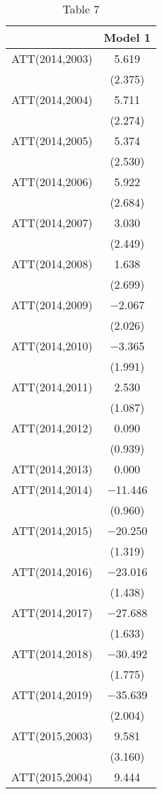 \begin{table}

\caption{\label{tab:write-results}Table 7}
\centering
\begin{tabular}[t]{lc}
\toprule
  & Model 1\\
\midrule
ATT(2014,2003) & \num{5.619}\\
 & (\num{2.375})\\
ATT(2014,2004) & \num{5.711}\\
 & (\num{2.274})\\
ATT(2014,2005) & \num{5.374}\\
 & (\num{2.530})\\
ATT(2014,2006) & \num{5.922}\\
 & (\num{2.684})\\
ATT(2014,2007) & \num{3.030}\\
 & (\num{2.449})\\
ATT(2014,2008) & \num{1.638}\\
 & (\num{2.699})\\
ATT(2014,2009) & \num{-2.067}\\
 & (\num{2.026})\\
ATT(2014,2010) & \num{-3.365}\\
 & (\num{1.991})\\
ATT(2014,2011) & \num{2.530}\\
 & (\num{1.087})\\
ATT(2014,2012) & \num{0.090}\\
 & (\num{0.939})\\
ATT(2014,2013) & \num{0.000}\\
ATT(2014,2014) & \num{-11.446}\\
 & (\num{0.960})\\
ATT(2014,2015) & \num{-20.250}\\
 & (\num{1.319})\\
ATT(2014,2016) & \num{-23.016}\\
 & (\num{1.438})\\
ATT(2014,2017) & \num{-27.688}\\
 & (\num{1.633})\\
ATT(2014,2018) & \num{-30.492}\\
 & (\num{1.775})\\
ATT(2014,2019) & \num{-35.639}\\
 & (\num{2.004})\\
ATT(2015,2003) & \num{9.581}\\
 & (\num{3.160})\\
ATT(2015,2004) & \num{9.444}\\

\end{tabular}
\end{table}

